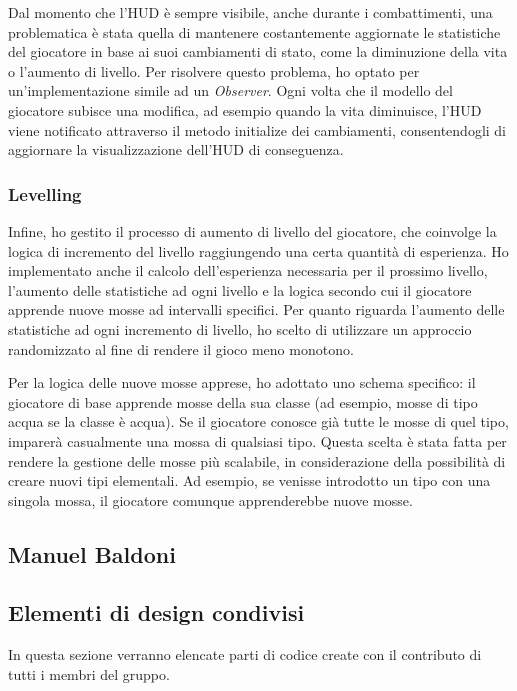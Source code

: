 \documentclass[a4paper,12pt]{report}
\begin{document}
Dal momento che l'HUD è sempre visibile, anche durante i combattimenti, una problematica è stata quella di mantenere costantemente aggiornate le statistiche del giocatore in base ai suoi cambiamenti di stato, come la diminuzione della vita o l'aumento di livello. Per risolvere questo problema, ho optato per un'implementazione simile ad un \textit{Observer}. Ogni volta che il modello del giocatore subisce una modifica, ad esempio quando la vita diminuisce, l'HUD viene notificato attraverso il metodo initialize dei cambiamenti, consentendogli di aggiornare la visualizzazione dell'HUD di conseguenza.
\subsubsection{Levelling}
Infine, ho gestito il processo di aumento di livello del giocatore, che coinvolge la logica di incremento del livello raggiungendo una certa quantità di esperienza. Ho implementato anche il calcolo dell'esperienza necessaria per il prossimo livello, l'aumento delle statistiche ad ogni livello e la logica secondo cui il giocatore apprende nuove mosse ad intervalli specifici.
Per quanto riguarda l'aumento delle statistiche ad ogni incremento di livello, ho scelto di utilizzare un approccio randomizzato al fine di rendere il gioco meno monotono.

Per la logica delle nuove mosse apprese, ho adottato uno schema specifico: il giocatore di base apprende mosse della sua classe (ad esempio, mosse di tipo acqua se la classe è acqua). Se il giocatore conosce già tutte le mosse di quel tipo, imparerà casualmente una mossa di qualsiasi tipo. Questa scelta è stata fatta per rendere la gestione delle mosse più scalabile, in considerazione della possibilità di creare nuovi tipi elementali. Ad esempio, se venisse introdotto un tipo con una singola mossa, il giocatore comunque apprenderebbe nuove mosse.

\subsection{Manuel Baldoni}

\subsection{Elementi di design condivisi}
In questa sezione verranno elencate parti di codice create con il contributo di tutti i membri del gruppo.\\
\end{document}
